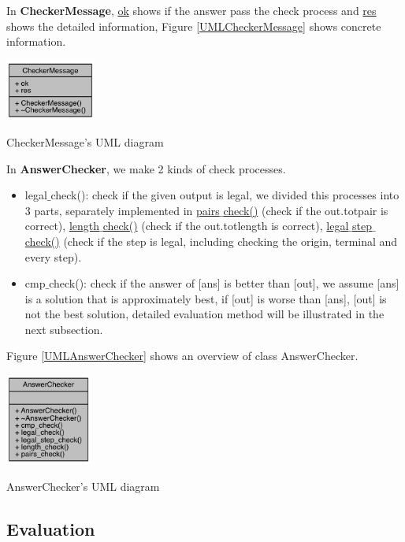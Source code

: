 \documentclass[twocolumn]{article}
\begin{document}
In \textbf{CheckerMessage}, \underline{ok} shows if the answer pass the check process and \underline{res} shows the detailed information, Figure \ref{UMLCheckerMessage} shows concrete information.

\begin{center}
\makeatletter
\def\@captype{figure}
\makeatother
\includegraphics [height=2cm]{UMLCheckerMessage}
\caption{CheckerMessage's UML diagram}
\label{UMLCheckerMessage}
\end{center}

In \textbf{AnswerChecker}, we make 2 kinds of check processes.

\begin{itemize}
    \item legal$\_$check(): check if the given output is legal, we divided this processes into 3 parts, separately implemented in \underline{pairs$\_$check()} (check if the out.totpair is correct), \underline{length$\_$check()} (check if the out.totlength is correct), \underline{legal$\_$step$\_$check()} (check if the step is legal, including checking the origin, terminal and every step).
    \item cmp$\_$check(): check if the answer of [ans] is better than [out], we assume [ans] is a solution that is approximately best, if [out] is worse than [ans], [out] is not the best solution, detailed evaluation method will be illustrated in the next subsection.
\end{itemize}

Figure \ref{UMLAnswerChecker} shows an overview of class AnswerChecker.

\begin{center}
\makeatletter
\def\@captype{figure}
\makeatother
\includegraphics [height=3cm]{UMLAnswerChecker}
\caption{AnswerChecker's UML diagram}
\label{UMLAnswerChecker}
\end{center}

\subsection{Evaluation}
\end{document}
